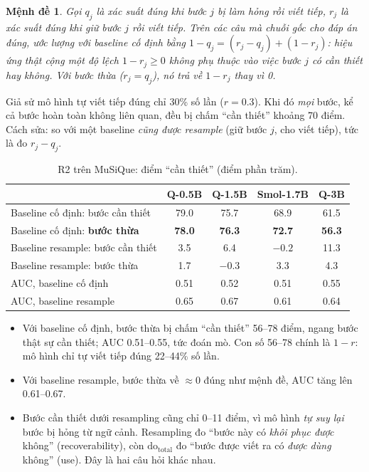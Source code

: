 \documentclass[11pt]{article}
\newtheorem{menhde}{Mệnh đề}
\newcommand{\dt}{\mathrm{do}_{\text{total}}}
\begin{document}
\begin{menhde}
Gọi $q_j$ là xác suất đúng khi bước $j$ bị làm hỏng rồi viết tiếp, $r_j$ là xác suất đúng khi giữ
bước $j$ rồi viết tiếp. Trên các câu mà chuỗi gốc cho đáp án đúng, ước lượng với baseline cố định
bằng $1-q_j=(r_j-q_j)+(1-r_j)$: hiệu ứng thật cộng một độ lệch $1-r_j\ge 0$ \emph{không phụ thuộc}
vào việc bước $j$ có cần thiết hay không. Với bước thừa ($r_j=q_j$), nó trả về $1-r_j$ thay vì 0.
\end{menhde}

\begin{vidu}
Giả sử mô hình tự viết tiếp đúng chỉ 30\% số lần ($r=0.3$). Khi đó \emph{mọi} bước, kể cả bước
hoàn toàn không liên quan, đều bị chấm ``cần thiết'' khoảng 70 điểm. Cách sửa: so với một baseline
\emph{cũng được resample} (giữ bước $j$, cho viết tiếp), tức là đo $r_j-q_j$.
\end{vidu}

\begin{table}[h]
\centering\small
\caption{R2 trên MuSiQue: điểm ``cần thiết'' (điểm phần trăm).}
\label{tab:r2}
\begin{tabular}{lcccc}
\toprule
 & Q-0.5B & Q-1.5B & Smol-1.7B & Q-3B \\
\midrule
Baseline cố định: bước cần thiết & 79.0 & 75.7 & 68.9 & 61.5 \\
Baseline cố định: \textbf{bước thừa} & \textbf{78.0} & \textbf{76.3} & \textbf{72.7} & \textbf{56.3} \\
Baseline resample: bước cần thiết & 3.5 & 6.4 & $-0.2$ & 11.3 \\
Baseline resample: bước thừa & 1.7 & $-0.3$ & 3.3 & 4.3 \\
\midrule
AUC, baseline cố định & 0.51 & 0.52 & 0.51 & 0.55 \\
AUC, baseline resample & 0.65 & 0.67 & 0.61 & 0.64 \\
\bottomrule
\end{tabular}
\end{table}

\begin{cachdoc}
\begin{itemize}[leftmargin=*,itemsep=1pt]
\item Với baseline cố định, bước thừa bị chấm ``cần thiết'' 56--78 điểm, ngang bước thật sự cần
  thiết; AUC 0.51--0.55, tức đoán mò. Con số 56--78 chính là $1-r$: mô hình chỉ tự viết tiếp đúng
  22--44\% số lần.
\item Với baseline resample, bước thừa về $\approx 0$ đúng như mệnh đề, AUC tăng lên 0.61--0.67.
\item Bước cần thiết dưới resampling cũng chỉ 0--11 điểm, vì mô hình \emph{tự suy lại} bước bị hỏng
  từ ngữ cảnh. Resampling đo ``bước này có \emph{khôi phục được} không'' (recoverability), còn
  $\dt$ đo ``bước được viết ra có \emph{được dùng} không'' (use). Đây là hai câu hỏi khác nhau.
\end{itemize}
\end{cachdoc}
\end{document}
